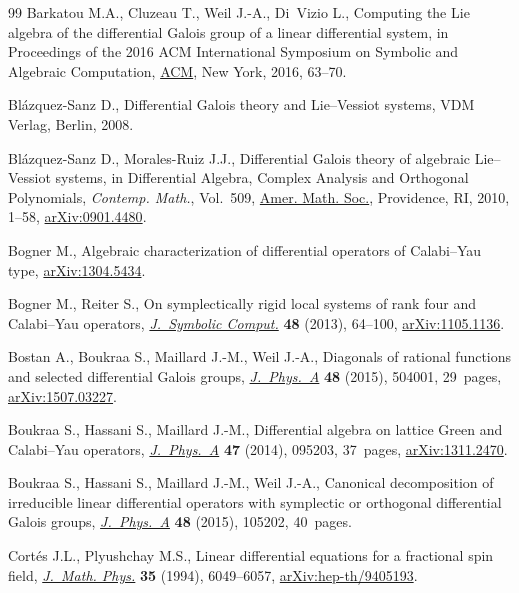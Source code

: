 \documentclass[10pt,a4paper]{amsart}
\numberwithin{equation}{section}
\begin{document}
\begin{thebibliography}{99}
Barkatou M.A., Cluzeau T., Weil J.-A., Di~Vizio L., Computing the {L}ie algebra
 of the differential {G}alois group of a linear differential system, in
 Proceedings of the 2016 {ACM} {I}nternational {S}ymposium on {S}ymbolic and
 {A}lgebraic {C}omputation, \href{https://doi.org/10.1145/2930889.2930932}{ACM}, New York, 2016, 63--70.

Bl\'azquez-Sanz D., Differential {G}alois theory and {L}ie--{V}essiot systems,
 {VDM} Verlag, Berlin, 2008.

Bl\'azquez-Sanz D., Morales-Ruiz J.J., Differential {G}alois theory of
 algebraic {L}ie--{V}essiot systems, in Differential Algebra, Complex Analysis
 and Orthogonal Polynomials, \textit{Contemp. Math.}, Vol.~509, \href{https://doi.org/10.1090/conm/509/09973}{Amer. Math.
 Soc.}, Providence, RI, 2010, 1--58, \href{https://arxiv.org/abs/0901.4480}{arXiv:0901.4480}.

Bogner M., Algebraic characterization of differential operators of
 {C}alabi--{Y}au type, \href{https://arxiv.org/abs/1304.5434}{arXiv:1304.5434}.

Bogner M., Reiter S., On symplectically rigid local systems of rank four and
 {C}alabi--{Y}au operators, \href{https://doi.org/10.1016/j.jsc.2011.11.007}{\textit{J.~Symbolic Comput.}} \textbf{48} (2013),
 64--100, \href{https://arxiv.org/abs/1105.1136}{arXiv:1105.1136}.

Bostan A., Boukraa S., Maillard J.-M., Weil J.-A., Diagonals of rational
 functions and selected differential {G}alois groups, \href{https://doi.org/10.1088/1751-8113/48/50/504001}{\textit{J.~Phys.~A}}
 \textbf{48} (2015), 504001, 29~pages, \href{https://arxiv.org/abs/1507.03227}{arXiv:1507.03227}.

Boukraa S., Hassani S., Maillard J.-M., Differential algebra on lattice {G}reen
 and {C}alabi--{Y}au operators, \href{https://doi.org/10.1088/1751-8113/47/9/095203}{\textit{J.~Phys.~A}} \textbf{47} (2014),
 095203, 37~pages, \href{https://arxiv.org/abs/1311.2470}{arXiv:1311.2470}.

Boukraa S., Hassani S., Maillard J.-M., Weil J.-A., Canonical decomposition of
 irreducible linear differential operators with symplectic or orthogonal
 differential {G}alois groups, \href{https://doi.org/10.1088/1751-8113/48/10/105202}{\textit{J.~Phys.~A}} \textbf{48} (2015), 105202,
 40~pages.

Cort\'es J.L., Plyushchay M.S., Linear differential equations for a fractional
 spin field, \href{https://doi.org/10.1063/1.530727}{\textit{J.~Math. Phys.}} \textbf{35} (1994), 6049--6057,
 \href{https://arxiv.org/abs/hep-th/9405193}{arXiv:hep-th/9405193}.


\end{thebibliography}
\end{document}
